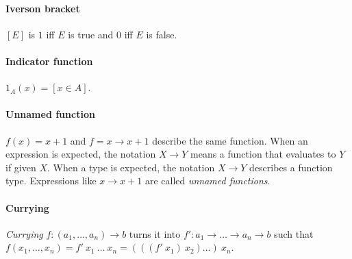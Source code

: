 %
\paragraph{Iverson bracket}
\([E]\) is \(1\) iff \(E\) is true
and \(0\) iff \(E\) is false.

%
\paragraph{Indicator function}
\(1_A(x) = [x \in A]\).

%
\paragraph{Unnamed function}
\(f(x) = x + 1\) and \(f = x \to x+1\) describe the same function.
When an expression is expected, the notation \(X \to Y\)
means a function that evaluates to \(Y\) if given \(X\).
When a type is expected, the notation \(X \to Y\) describes a function type.
Expressions like \(x \to x + 1\) are called \emph{unnamed functions}.

\paragraph{Currying}
%
%
\emph{Currying} \(f : (a_1,\ldots,a_n) \to b\) turns it into \(f' : a_1 \to \ldots \to a_n \to b\)
such that \(f(x_1,\ldots,x_n)
= f'~x_1~\ldots~x_n
= (((f'~x_1)~x_2)\ldots)~x_n\).

